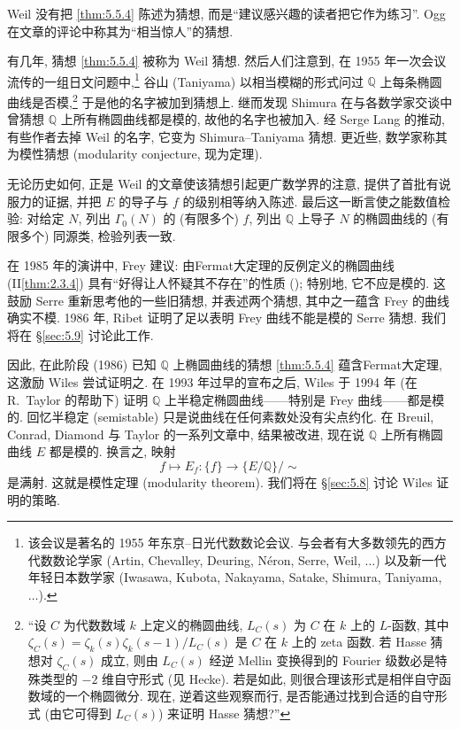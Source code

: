 Weil 没有把 \ref{thm:5.5.4} 陈述为猜想, 而是``建议感兴趣的读者把它作为练习''. Ogg 在文章的评论中称其为``相当惊人''的猜想.

有几年, 猜想 \ref{thm:5.5.4} 被称为 Weil 猜想. 然后人们注意到, 在 1955 年一次会议流传的一组日文问题中,\footnote{该会议是著名的 1955 年东京--日光代数数论会议. 与会者有大多数领先的西方代数数论学家 (Artin, Chevalley, Deuring, N\'eron, Serre, Weil, $\dots$) 以及新一代年轻日本数学家 (Iwasawa, Kubota, Nakayama, Satake, Shimura, Taniyama, $\dots$).} 谷山 (Taniyama) 以相当模糊的形式问过 $\mathbb{Q}$ 上每条椭圆曲线是否模,\footnote{``设 $C$ 为代数数域 $k$ 上定义的椭圆曲线, $L_C(s)$ 为 $C$ 在 $k$ 上的 $L$-函数, 其中 $\zeta_C(s) = \zeta_k(s)\zeta_k(s-1)/L_C(s)$ 是 $C$ 在 $k$ 上的 zeta 函数. 若 Hasse 猜想对 $\zeta_C(s)$ 成立, 则由 $L_C(s)$ 经逆 Mellin 变换得到的 Fourier 级数必是特殊类型的 $-2$ 维自守形式 (见 Hecke). 若是如此, 则很合理该形式是相伴自守函数域的一个椭圆微分. 现在, 逆着这些观察而行, 是否能通过找到合适的自守形式 (由它可得到 $L_C(s)$) 来证明 Hasse 猜想?''} 于是他的名字被加到猜想上. 继而发现 Shimura 在与各数学家交谈中曾猜想 $\mathbb{Q}$ 上所有椭圆曲线都是模的, 故他的名字也被加入. 经 Serge Lang 的推动, 有些作者去掉 Weil 的名字, 它变为 Shimura--Taniyama 猜想. 更近些, 数学家称其为模性猜想 (modularity conjecture, 现为定理).

无论历史如何, 正是 Weil 的文章使该猜想引起更广数学界的注意, 提供了首批有说服力的证据, 并把 $E$ 的导子与 $f$ 的级别相等纳入陈述. 最后这一断言使之能数值检验: 对给定 $N$, 列出 $\Gamma_0(N)$ 的 (有限多个) $f$, 列出 $\mathbb{Q}$ 上导子 $N$ 的椭圆曲线的 (有限多个) 同源类, 检验列表一致.

在 1985 年的演讲中, Frey 建议: 由Fermat大定理的反例定义的椭圆曲线 (II\ref{thm:2.3.4}) 具有``好得让人怀疑其不存在''的性质 (\cite{frey1986}); 特别地, 它不应是模的. 这鼓励 Serre 重新思考他的一些旧猜想, 并表述两个猜想, 其中之一蕴含 Frey 的曲线确实不模. 1986 年, Ribet 证明了足以表明 Frey 曲线不能是模的 Serre 猜想. 我们将在 \S\ref{sec:5.9} 讨论此工作.

因此, 在此阶段 (1986) 已知 $\mathbb{Q}$ 上椭圆曲线的猜想 \ref{thm:5.5.4} 蕴含Fermat大定理, 这激励 Wiles 尝试证明之. 在 1993 年过早的宣布之后, Wiles 于 1994 年 (在 R.~Taylor 的帮助下) 证明 $\mathbb{Q}$ 上半稳定椭圆曲线——特别是 Frey 曲线——都是模的. 回忆半稳定 (semistable) 只是说曲线在任何素数处没有尖点约化. 在 Breuil, Conrad, Diamond 与 Taylor 的一系列文章中, 结果被改进, 现在说 $\mathbb{Q}$ 上所有椭圆曲线 $E$ 都是模的. 换言之, 映射
\[
f\mapsto E_f\colon\{f\}\to\{E/\mathbb{Q}\}/{\sim}
\]
是满射. 这就是模性定理 (modularity theorem). 我们将在 \S\ref{sec:5.8} 讨论 Wiles 证明的策略.

